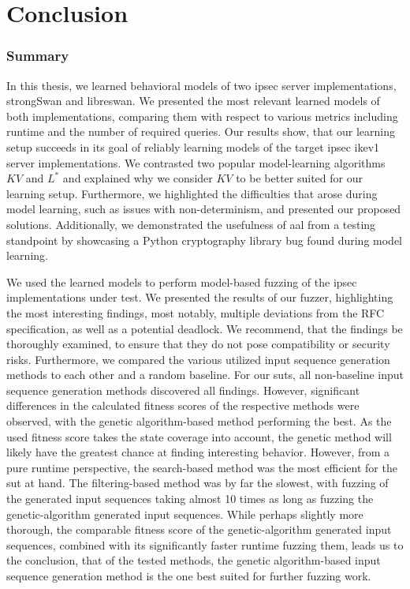 %
%
% 

\chapter{Conclusion}
\label{chap:Conclusion}

\subsection{Summary}
In this thesis, we learned behavioral models of two \ac{ipsec} server implementations, strongSwan and libreswan. We presented the most relevant learned models of both implementations, comparing them with respect to various metrics including runtime and the number of required queries. Our results show, that our learning setup succeeds in its goal of reliably learning models of the target \ac{ipsec} \ac{ike}v1 server implementations. We contrasted two popular model-learning algorithms $KV$ and $L^*$ and explained why we consider $KV$ to be better suited for our learning setup. Furthermore, we highlighted the difficulties that arose during model learning, such as issues with non-determinism, and presented our proposed solutions. Additionally, we demonstrated the usefulness of \ac{aal} from a testing standpoint by showcasing a Python cryptography library bug found during model learning. 

We used the learned models to perform model-based fuzzing of the \ac{ipsec} implementations under test. We presented the results of our fuzzer, highlighting the most interesting findings, most notably, multiple deviations from the RFC specification, as well as a potential deadlock. We recommend, that the findings be thoroughly examined, to ensure that they do not pose compatibility or security risks. Furthermore, we compared the various utilized input sequence generation methods to each other and a random baseline. For our \acp{sut}, all non-baseline input sequence generation methods discovered all findings. However, significant differences in the calculated fitness scores of the respective methods were observed, with the genetic algorithm-based method performing the best. As the used fitness score takes the state coverage into account, the genetic method will likely have the greatest chance at finding interesting behavior. However, from a pure runtime perspective, the search-based method was the most efficient for the \ac{sut} at hand. The filtering-based method was by far the slowest, with fuzzing of the generated input sequences taking almost 10 times as long as fuzzing the genetic-algorithm generated input sequences. While perhaps slightly more thorough, the comparable fitness score of the genetic-algorithm generated input sequences, combined with its significantly faster runtime fuzzing them, leads us to the conclusion, that of the tested methods, the genetic algorithm-based input sequence generation method is the one best suited for further fuzzing work.

